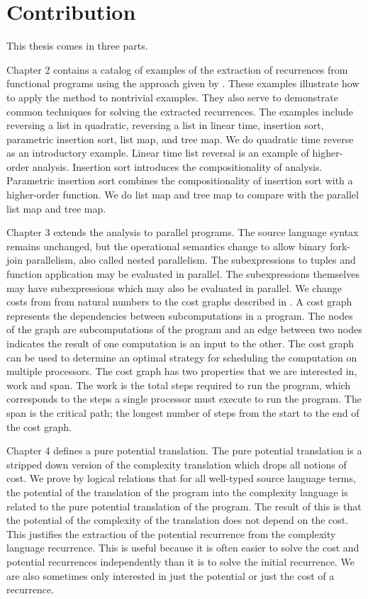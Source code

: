 \section{Contribution}

This thesis comes in three parts.



Chapter 2 contains a catalog of examples of the extraction of recurrences
from functional programs using the approach given by \citet{Danner2015}. These
examples illustrate how to apply the method to nontrivial examples. They also
serve to demonstrate common techniques for solving the extracted recurrences.
The examples include reversing a list in quadratic, reversing a list in linear
time, insertion sort, parametric insertion sort, list map, and tree map. We do
quadratic time reverse as an introductory example. Linear time list reversal is
an example of higher-order analysis. Insertion sort introduces the
compositionality of analysis. Parametric insertion sort combines the
compositionality of insertion sort with a higher-order function. We do list map
and tree map to compare with the parallel list map and tree map.




Chapter 3 extends the analysis to parallel programs. The source language syntax
remains unchanged, but the operational semantics change to allow binary
fork-join parallelism, also called nested parallelism. The subexpressions to
tuples and function application may be evaluated in parallel. The
subexpressions themselves may have subexpressions which may also be evaluated
in parallel. We change costs from from natural numbers to the cost graphs
described in \citet{Harper2012PFPL}. A cost graph represents the dependencies
between subcomputations in a program.  The nodes of the graph are
subcomputations of the program and an edge between two nodes indicates the
result of one computation is an input to the other. The cost graph can be used
to determine an optimal strategy for scheduling the computation on multiple
processors. The cost graph has two properties that we are interested in, work
and span. The work is the total steps required to run the program, which
corresponds to the steps a single processor must execute to run the program.
The span is the critical path; the longest number of steps from the start to
the end of the cost graph.



Chapter 4 defines a pure potential translation. The pure potential translation
is a stripped down version of the complexity translation which drops all
notions of cost. We prove by logical relations that for all well-typed source
language terms, the potential of the translation of the program into the
complexity language is related to the pure potential translation of the
program. The result of this is that the potential of the complexity of the
translation does not depend on the cost. This justifies the extraction of the
potential recurrence from the complexity language recurrence. This is useful
because it is often easier to solve the cost and potential recurrences
independently than it is to solve the initial recurrence. We are also sometimes
only interested in just the potential or just the cost of a recurrence.
